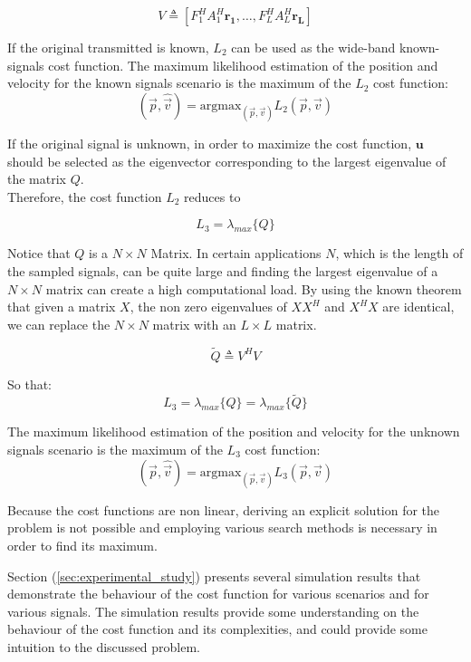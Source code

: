 \begin{equation}
V \triangleq [F_1^H A_1^H \mathbf{r_1},\dots ,F_L^H A_L^H \mathbf{r_L}]                                                        
\end{equation}

If the original transmitted is known, $L_2$ can be used as the wide-band known-signals cost function.
The maximum likelihood estimation of the position and velocity for the known signals scenario is the maximum of the $L_2$ cost function:
\begin{equation}
(\hat{\vec{p}},\hat{\vec{v}}) = \text{argmax}_{(\vec{p},\vec{v})}L_2(\vec{p},\vec{v})
\end{equation}

If the original signal is unknown, in order to maximize the cost function, $\mathbf{u}$ should be selected as the eigenvector corresponding to the largest eigenvalue of the matrix $Q$.\\

Therefore, the cost function $L_2$ reduces to

\begin{equation}
L_3=\lambda_{max}\{Q\}
\end{equation}

Notice that $Q$ is a $N \times N$ Matrix. In certain applications $N$, which is the length of the sampled signals, can be quite large and finding the largest eigenvalue of a $N \times N$ matrix can create a high computational load.
By using the known theorem that given a matrix $X$, the non zero eigenvalues of $XX^H$ and $X^H X$ are identical, we can replace the $N \times N$ matrix with an $L \times L$ matrix. 

\begin{equation}
\tilde{Q}  \triangleq V^H V                                                                               
\end{equation}

So that:
\begin{equation}
L_3=\lambda_{max}\{Q\} = \lambda_{max}\{\tilde{Q}\} 
\end{equation}


The maximum likelihood estimation of the position and velocity for the unknown signals scenario is the maximum of the $L_3$ cost function:
\begin{equation}
(\hat{\vec{p}},\hat{\vec{v}}) = \text{argmax}_{(\vec{p},\vec{v})}L_3(\vec{p},\vec{v})
\end{equation}

Because the cost functions are non linear, deriving an explicit solution for the problem is not possible and employing various search methods is necessary in order to find its maximum.

Section (\ref{sec:experimental_study}) presents several simulation results that demonstrate the behaviour of the cost function for various scenarios and for various signals. The simulation results provide some understanding on the behaviour of the cost function and its complexities, and could provide some intuition to the discussed problem.
